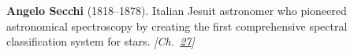 \textbf{Angelo Secchi} (1818–1878). Italian Jesuit astronomer who pioneered astronomical spectroscopy by creating the first comprehensive spectral classification system for stars. \emph{[Ch.~\hyperref[ch:planetaryskycolors]{27}]}

